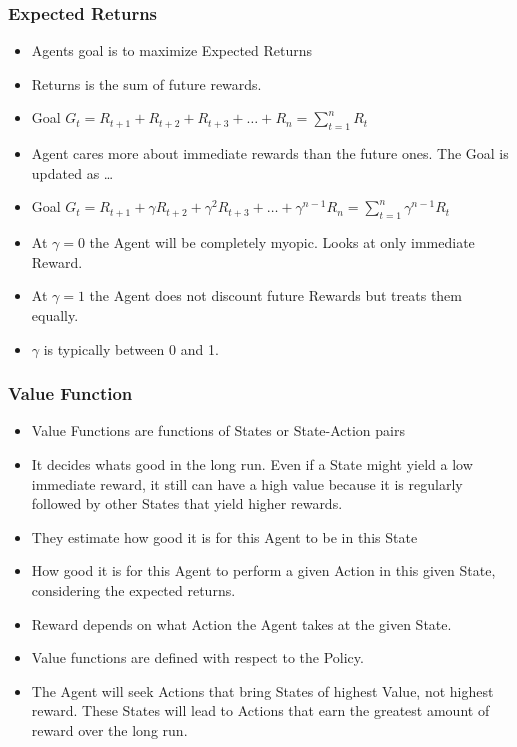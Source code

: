 \begin{frame}[fragile]\frametitle{Expected Returns}

\begin{itemize}
\item Agents goal is to maximize Expected Returns
\item Returns is the sum of future rewards.
\item Goal $G_t= R_{t+1} + R_{t+2} + R_{t+3} + \ldots + R_n = \sum_{t=1}^{n}R_t$
\item Agent cares more about immediate rewards than the future ones. The Goal is updated as \ldots
\item Goal $G_t= R_{t+1} + \gamma R_{t+2} + \gamma^2 R_{t+3} + \ldots + \gamma^{n-1}R_n = \sum_{t=1}^{n}\gamma^{n-1}R_t$
\item At $\gamma = 0$ the Agent will be completely myopic. Looks at only immediate Reward.
\item At $\gamma = 1$ the Agent does not discount future Rewards but treats them equally.
\item $\gamma$ is typically between 0 and 1.

\end{itemize}

\end{frame}



\begin{frame}[fragile]\frametitle{Value Function}

\begin{itemize}
\item Value Functions are functions of States or State-Action pairs
\item It decides whats good in the long run. Even if a State might yield a low immediate reward, it still can have a high value because it is regularly followed by other States that yield higher rewards.
\item They estimate how good it is for this Agent to be in this State
\item How good it is for this Agent to perform a given Action in this given State, considering the expected returns.
\item Reward depends on what Action the Agent takes at the given State.
\item Value functions are defined with respect to the Policy.
\item The Agent will seek Actions that bring States of highest Value, not highest reward. These States will lead to Actions that earn the greatest amount of reward over the long run.
\end{itemize}

\end{frame}

